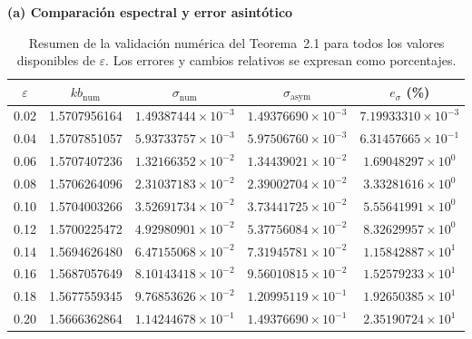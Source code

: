 \documentclass[11pt]{article}
\begin{document}
\begin{table}[!htbp]
\centering
\caption{Resumen de la validación numérica del Teorema~2.1 para todos los valores disponibles de $\varepsilon$. Los errores y cambios relativos se expresan como porcentajes.}
\label{tab:t21_summary}
\small
\setlength{\tabcolsep}{5pt}
\textbf{(a) Comparación espectral y error asintótico}\\[0.4em]
\begin{tabular}{@{}ccccc@{}}
\toprule
$\varepsilon$ & $kb_{\mathrm{num}}$ & $\sigma_{\mathrm{num}}$ & $\sigma_{\mathrm{asym}}$ & $e_\sigma$ (\%) \\
\midrule
0.02 & 1.5707956164 & $1.49387444\times10^{-3}$ & $1.49376690\times10^{-3}$ & $7.19933310\times10^{-3}$ \\
0.04 & 1.5707851057 & $5.93733757\times10^{-3}$ & $5.97506760\times10^{-3}$ & $6.31457665\times10^{-1}$ \\
0.06 & 1.5707407236 & $1.32166352\times10^{-2}$ & $1.34439021\times10^{-2}$ & $1.69048297\times10^{0}$ \\
0.08 & 1.5706264096 & $2.31037183\times10^{-2}$ & $2.39002704\times10^{-2}$ & $3.33281616\times10^{0}$ \\
0.10 & 1.5704003266 & $3.52691734\times10^{-2}$ & $3.73441725\times10^{-2}$ & $5.55641991\times10^{0}$ \\
0.12 & 1.5700225472 & $4.92980901\times10^{-2}$ & $5.37756084\times10^{-2}$ & $8.32629957\times10^{0}$ \\
0.14 & 1.5694626480 & $6.47155068\times10^{-2}$ & $7.31945781\times10^{-2}$ & $1.15842887\times10^{1}$ \\
0.16 & 1.5687057649 & $8.10143418\times10^{-2}$ & $9.56010815\times10^{-2}$ & $1.52579233\times10^{1}$ \\
0.18 & 1.5677559345 & $9.76853626\times10^{-2}$ & $1.20995119\times10^{-1}$ & $1.92650385\times10^{1}$ \\
0.20 & 1.5666362864 & $1.14244678\times10^{-1}$ & $1.49376690\times10^{-1}$ & $2.35190724\times10^{1}$ \\
\bottomrule
\end{tabular}


\end{table}
\end{document}
